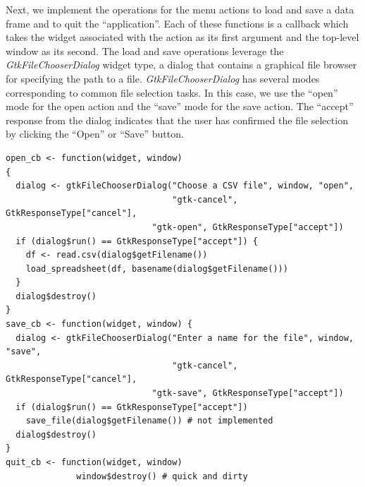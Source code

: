 \documentclass[article]{jss}
\begin{document}
Next, we implement the operations for the menu actions to load and
save a data frame and to quit the ``application''. Each of these
functions is a callback which takes the widget associated with the
action as its first argument and the top-level window as its
second. The load and save operations leverage the
\emph{GtkFileChooserDialog} widget type, a dialog that contains a
graphical file browser for specifying the path to a
file. \emph{GtkFileChooserDialog} has several modes corresponding to
common file selection tasks. In this case, we use the ``open'' mode
for the open action and the ``save'' mode for the save action. The
``accept'' response from the dialog indicates that the user has
confirmed the file selection by clicking the ``Open'' or ``Save''
button.
\begin{verbatim}
open_cb <- function(widget, window)  
{
  dialog <- gtkFileChooserDialog("Choose a CSV file", window, "open",
                                 "gtk-cancel", GtkResponseType["cancel"],
	      	                 "gtk-open", GtkResponseType["accept"])
  if (dialog$run() == GtkResponseType["accept"]) {
    df <- read.csv(dialog$getFilename())
    load_spreadsheet(df, basename(dialog$getFilename()))
  }
  dialog$destroy()
}
save_cb <- function(widget, window) {
  dialog <- gtkFileChooserDialog("Enter a name for the file", window, "save",
                                 "gtk-cancel", GtkResponseType["cancel"],
          	                 "gtk-save", GtkResponseType["accept"])
  if (dialog$run() == GtkResponseType["accept"])
    save_file(dialog$getFilename()) # not implemented
  dialog$destroy()
}
quit_cb <- function(widget, window) 
              window$destroy() # quick and dirty

\end{verbatim}
\end{document}
